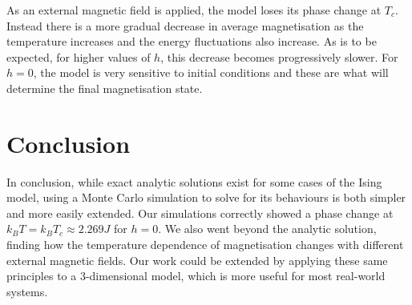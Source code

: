 \documentclass[11pt]{article}
\begin{document}
	As an external magnetic field is applied, the model loses its phase change at $T_c$. Instead there is a more gradual decrease in average magnetisation as the temperature increases and the energy fluctuations also increase. As is to be expected, for higher values of $h$, this decrease becomes progressively slower. For $h=0$, the model is very sensitive to initial conditions and these are what will determine the final magnetisation state. 
	
	\section{Conclusion}
  
	In conclusion, while exact analytic solutions exist for some cases of the Ising model, using a Monte Carlo simulation to solve for its behaviours is both simpler and more easily extended. Our simulations correctly showed a phase change at $k_B T = k_BT_c \approx 2.269 J$ for $h=0$. We also went beyond the analytic solution, finding how the temperature dependence of magnetisation changes with different external magnetic fields. Our work could be extended by applying these same principles to a 3-dimensional model, which is more useful for most real-world systems.
	
	 
\end{document}
